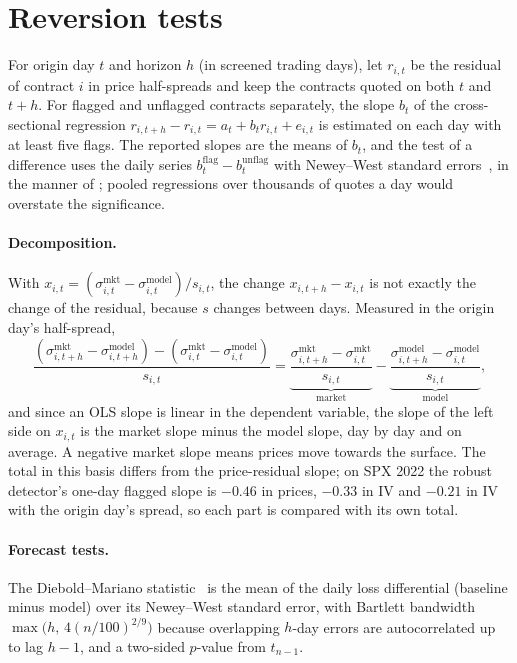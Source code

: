 \section{Reversion tests}
\label{app:reversion}

For origin day $t$ and horizon $h$ (in screened trading days), let $r_{i,t}$ be the residual of
contract $i$ in price half-spreads and keep the contracts quoted on both $t$ and $t+h$. For flagged and
unflagged contracts separately, the slope $b_t$ of the cross-sectional regression
$r_{i,t+h}-r_{i,t}=a_t+b_t r_{i,t}+e_{i,t}$ is estimated on each day with at least five flags. The
reported slopes are the means of $b_t$, and the test of a difference uses the daily series
$b^{\text{flag}}_t-b^{\text{unflag}}_t$ with Newey--West standard errors~\citep{newey1987}, in the
manner of \citet{fama1973}; pooled regressions over thousands of quotes a day would overstate the
significance.

\paragraph{Decomposition.} With $x_{i,t}=(\sigma^{\text{mkt}}_{i,t}-\sigma^{\text{model}}_{i,t})/s_{i,t}$,
the change $x_{i,t+h}-x_{i,t}$ is not exactly the change of the residual, because $s$ changes between
days. Measured in the origin day's half-spread,
\[
  \frac{(\sigma^{\text{mkt}}_{i,t+h}-\sigma^{\text{model}}_{i,t+h})-(\sigma^{\text{mkt}}_{i,t}-\sigma^{\text{model}}_{i,t})}{s_{i,t}}
  =\underbrace{\frac{\sigma^{\text{mkt}}_{i,t+h}-\sigma^{\text{mkt}}_{i,t}}{s_{i,t}}}_{\text{market}}
  -\underbrace{\frac{\sigma^{\text{model}}_{i,t+h}-\sigma^{\text{model}}_{i,t}}{s_{i,t}}}_{\text{model}},
\]
and since an OLS slope is linear in the dependent variable, the slope of the left side on $x_{i,t}$ is
the market slope minus the model slope, day by day and on average. A negative market slope means
prices move towards the surface. The total in this basis differs from the price-residual slope; on
SPX 2022 the robust detector's one-day flagged slope is $-0.46$ in prices, $-0.33$ in IV and $-0.21$
in IV with the origin day's spread, so each part is compared with its own total.

\paragraph{Forecast tests.} The Diebold--Mariano statistic~\citep{diebold1995} is the mean of the
daily loss differential (baseline minus model) over its Newey--West standard error, with Bartlett
bandwidth $\max\bigl(h,\,4(n/100)^{2/9}\bigr)$ because overlapping $h$-day errors are autocorrelated
up to lag $h-1$, and a two-sided $p$-value from $t_{n-1}$.

